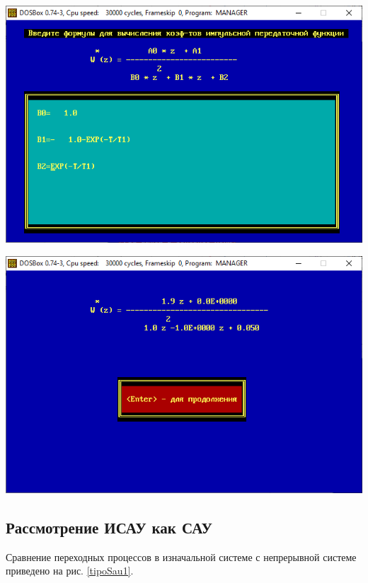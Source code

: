 \begin{center}
\begin{minipage}{.45\textwidth}
		\end{minipage}
		\begin{minipage}{.45\textwidth}
			\includegraphics[width=\textwidth]{png/pars2.png}
		\end{minipage} \begin{minipage}{.45\textwidth}
			\includegraphics[width=\textwidth]{png/w(z).png}
		\end{minipage}
		\label{input}
	\end{center}
	
	\subsection{Рассмотрение ИСАУ как САУ}
	
	Сравнение переходных процессов в изначальной системе с непрерывной системе приведено на рис. \ref{tipoSau1}.
	
